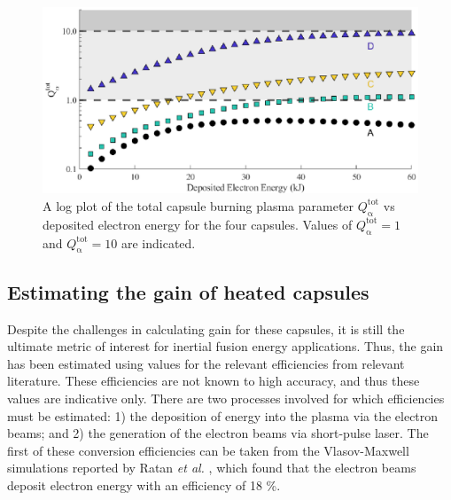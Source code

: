 \begin{figure}[ht]
\centering
\includegraphics{figures/FurtherSims/QHeatingPlot.eps}
\caption{A log plot of the total capsule burning plasma parameter $Q^\mathrm{{tot}}_{\mathrm{\alpha}}$ vs deposited electron energy for the four capsules. Values of $Q^\mathrm{{tot}}_{\mathrm{\alpha}} = 1$ and $Q^\mathrm{{tot}}_{\mathrm{\alpha}} = 10$ are indicated.}
\label{fig:HeatedQ}
\end{figure}

\subsection{Estimating the gain of heated capsules}

Despite the challenges in calculating gain for these capsules, it is still the ultimate metric of interest for inertial fusion energy applications. Thus, the gain has been estimated using values for the relevant efficiencies from relevant literature. These efficiencies are not known to high accuracy, and thus these values are indicative only. There are two processes involved for which efficiencies must be estimated: 1) the deposition of energy into the plasma via the electron beams; and 2) the generation of the electron beams via short-pulse laser. The first of these conversion efficiencies can be taken from the Vlasov-Maxwell simulations reported by Ratan \textit{et al.} \cite{Ratan2017}, which found that the electron beams deposit electron energy with an efficiency of 18 \%.

